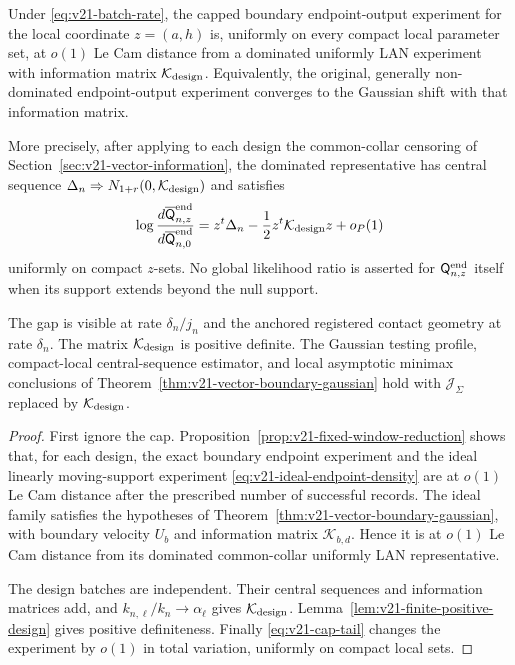 \begin{theorem}
\label{thm:v21-fixed-window-gaussian}
Under \eqref{eq:v21-batch-rate}, the capped boundary endpoint-output
experiment for the local coordinate $z=(a,h)$ is, uniformly on every compact
local parameter set, at $o(1)$ Le Cam distance from a dominated uniformly LAN
experiment with information matrix $\mathcal K_{\rm design}$.  Equivalently,
the original, generally non-dominated endpoint-output experiment converges to
the Gaussian shift with that information matrix.

More precisely, after applying to each design the common-collar censoring of
Section~\ref{sec:v21-vector-information}, the dominated representative has
central sequence
$\Delta_n\Rightarrow N_{1+r}(0,\mathcal K_{\rm design})$ and satisfies
\begin{equation}\label{eq:v21-physical-lan-representative}
 \log\frac{d\overline{\mathsf Q}_{n,z}^{\rm end}}
          {d\overline{\mathsf Q}_{n,0}^{\rm end}}
 =z^t\Delta_n-\frac12z^t\mathcal K_{\rm design}z+o_P(1)
\end{equation}
uniformly on compact $z$-sets.  No global likelihood ratio is asserted for
$\mathsf Q_{n,z}^{\rm end}$ itself when its support extends beyond the null
support.

The gap is visible at rate $\delta_n/j_n$ and the anchored registered contact
geometry at rate $\delta_n$.  The matrix $\mathcal K_{\rm design}$ is positive
definite.  The Gaussian testing profile, compact-local central-sequence
estimator, and local asymptotic minimax conclusions of
Theorem~\ref{thm:v21-vector-boundary-gaussian} hold with
$\mathcal J_\Sigma$ replaced by $\mathcal K_{\rm design}$.
\end{theorem}

\begin{proof}
First ignore the cap.  Proposition~\ref{prop:v21-fixed-window-reduction}
shows that, for each design, the exact boundary endpoint experiment and the
ideal linearly moving-support experiment
\eqref{eq:v21-ideal-endpoint-density} are at $o(1)$ Le Cam distance after the
prescribed number of successful records.  The ideal family satisfies the
hypotheses of Theorem~\ref{thm:v21-vector-boundary-gaussian}, with boundary
velocity $U_b$ and information matrix $\mathcal K_{b,d}$.  Hence it is at
$o(1)$ Le Cam distance from its dominated common-collar uniformly LAN
representative.

The design batches are independent.  Their central sequences and information
matrices add, and $k_{n,\ell}/k_n\to\alpha_\ell$ gives
$\mathcal K_{\rm design}$.  Lemma~\ref{lem:v21-finite-positive-design} gives
positive definiteness.  Finally \eqref{eq:v21-cap-tail} changes the experiment
by $o(1)$ in total variation, uniformly on compact local sets.
\end{proof}

